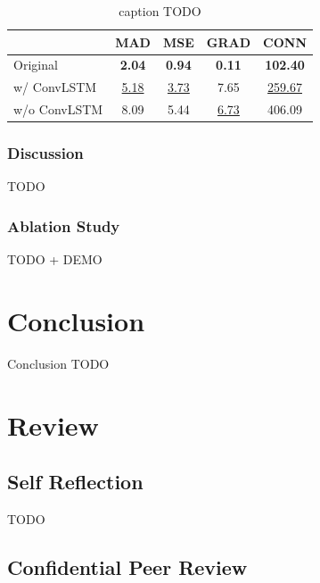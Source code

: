 \documentclass[final]{cvpr}
\begin{document}
\begin{table}[htb]
    \centering
    \caption{caption TODO}
    \label{result}
    \begin{tabular}{lcccc}
        \toprule
        {}               & MAD              & MSE              & GRAD             & CONN               \\
        \midrule
        Original         & \textbf{2.04}    & \textbf{0.94}    & \textbf{0.11}    & \textbf{102.40}    \\
        \midrule
        w/ ConvLSTM    & \underline{5.18} & \underline{3.73} & 7.65             & \underline{259.67} \\
        w/o ConvLSTM & 8.09             & 5.44             & \underline{6.73} & 406.09             \\
        \bottomrule
    \end{tabular}
\end{table}

\subsubsection{Discussion}

TODO

\subsubsection{Ablation Study}

TODO + DEMO

\section{Conclusion}

Conclusion TODO




\section{Review}

\subsection{Self Reflection}

TODO

\subsection{Confidential Peer Review}
\end{document}
